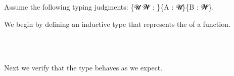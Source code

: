 Assume the following typing judgments: \{\ab 𝓤 \ab 𝓦 \as : \}\{\ab A \as : \ab 𝓤\af ̇\}\{\ab B \as : \ab 𝓦\af ̇\}.


\noindent We begin by defining an inductive type that represents the  of a function.
\ccpad
\begin{code}%
\>[1]\AgdaSpace{}%
\AgdaSpace{}%
\AgdaSymbol{(}\AgdaSpace{}%
\AgdaSymbol{:}\AgdaSpace{}%
\AgdaSpace{}%
\AgdaSpace{}%
\AgdaSymbol{)}\AgdaSpace{}%
\AgdaSymbol{:}\AgdaSpace{}%
\AgdaSpace{}%
\AgdaSpace{}%
\AgdaSpace{}%
\AgdaSpace{}%
\AgdaSpace{}%
\AgdaSpace{}%
\<%
\\
\>[1][@{}l@{\AgdaIndent{0}}]%
\>[2]\AgdaSpace{}%
\AgdaSymbol{:}\AgdaSpace{}%
\AgdaSymbol{(}\AgdaSpace{}%
\AgdaSymbol{:}\AgdaSpace{}%
\AgdaSymbol{)}\AgdaSpace{}%
\AgdaSpace{}%
\AgdaSpace{}%
\AgdaSpace{}%
\AgdaSpace{}%
\AgdaSpace{}%
\<%
\\
%
\>[2]\AgdaSpace{}%
\AgdaSymbol{:}\AgdaSpace{}%
\AgdaSymbol{(}\AgdaSpace{}%
\AgdaSymbol{:}\AgdaSpace{}%
\AgdaSymbol{)}\AgdaSpace{}%
\AgdaSpace{}%
\AgdaSymbol{(}\AgdaSpace{}%
\AgdaSymbol{:}\AgdaSpace{}%
\AgdaSymbol{)}\AgdaSpace{}%
\AgdaSpace{}%
\AgdaSpace{}%
\AgdaSpace{}%
\AgdaSpace{}%
\AgdaSpace{}%
\AgdaSpace{}%
\AgdaSpace{}%
\AgdaSpace{}%
\AgdaSpace{}%
\<%
\end{code}
\ccpad
Next we verify that the type behaves as we expect.
\ccpad

